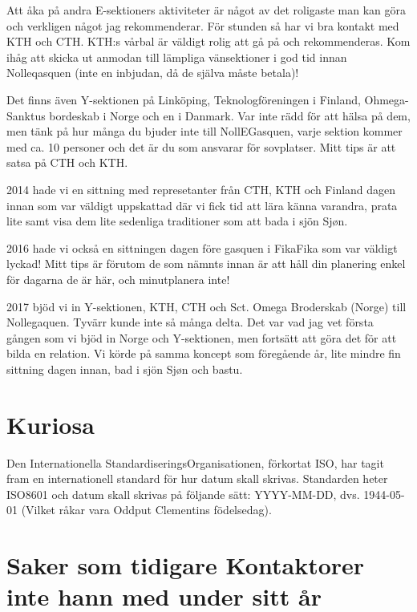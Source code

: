 \documentclass[10pt]{article}
\begin{document}
Att åka på andra E-sektioners aktiviteter är något av det roligaste man kan göra och verkligen något jag rekommenderar. För stunden så har vi bra kontakt med KTH och CTH. KTH:s vårbal är väldigt rolig att gå på och rekommenderas. Kom ihåg att skicka ut anmodan till lämpliga vänsektioner i god tid innan Nolleqasquen (inte en inbjudan, då de själva måste betala)!

Det finns även Y-sektionen på Linköping, Teknologföreningen i Finland, Ohmega-Sanktus bordeskab i Norge och en i Danmark. Var inte rädd för att hälsa på dem, men tänk på hur många du bjuder inte till NollEGasquen, varje sektion kommer med ca. 10 personer och det är du som ansvarar för sovplatser. Mitt tips är att satsa på CTH och KTH.

2014 hade vi en sittning med represetanter från CTH, KTH och Finland dagen innan som var väldigt uppskattad där vi fick tid att lära känna varandra, prata lite samt visa dem lite sedenliga traditioner som att bada i sjön Sj\o n.

2016 hade vi också en sittningen dagen före gasquen i FikaFika som var väldigt lyckad! Mitt tips är förutom de som nämnts innan är att håll din planering enkel för dagarna de är här, och minutplanera inte!

2017 bjöd vi in Y-sektionen, KTH, CTH och Sct. Omega Broderskab (Norge) till Nollegaquen. Tyvärr kunde inte så många delta. Det var vad jag vet första gången som vi bjöd in Norge och Y-sektionen, men fortsätt att göra det för att bilda en relation. Vi körde på samma koncept som föregående år, lite mindre fin sittning dagen innan, bad i sjön Sj\o n och bastu.

\section{Kuriosa}
Den Internationella StandardiseringsOrganisationen, förkortat ISO, har tagit fram en internationell standard för hur datum skall skrivas. Standarden heter ISO8601 och datum skall skrivas på följande sätt: YYYY-MM-DD, dvs. 1944-05-01 (Vilket råkar vara Oddput Clementins födelsedag).

\section{Saker som tidigare Kontaktorer inte hann med under sitt år}
\end{document}
